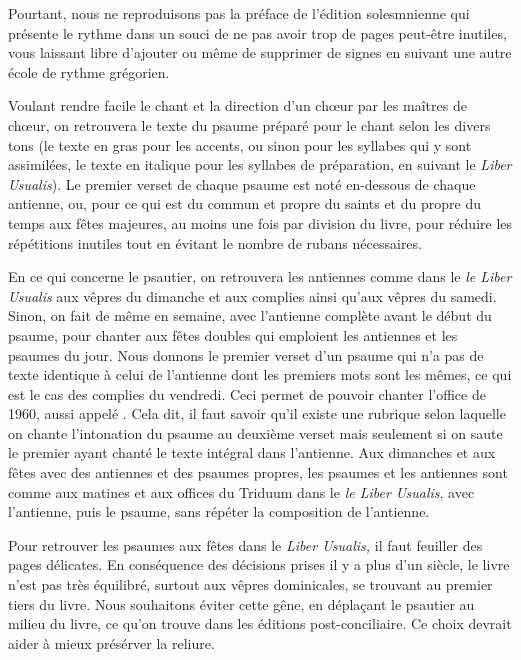 \begin{frpars}
Pourtant, nous ne reproduisons pas la préface de l'édition solesmnienne qui présente le rythme dans un souci de ne pas avoir trop de pages peut-être inutiles, vous laissant libre d'ajouter ou même de supprimer de signes en suivant une autre école de rythme grégorien.

Voulant rendre facile le chant et la direction d'un chœur par les maîtres de chœur, on retrouvera le texte du psaume préparé pour le chant selon les divers tons (le texte en gras pour les accents, ou sinon pour les syllabes qui y sont assimilées, le texte en italique pour les syllabes de préparation, en suivant le \textit{Liber Usualis}). Le premier verset de chaque psaume est noté en-dessous de chaque antienne, ou, pour ce qui est du commun et propre du saints et du propre du temps aux fêtes majeures, au moins une fois par division du livre, pour réduire les répétitions inutiles tout en évitant le nombre de rubans nécessaires.

En ce qui concerne le psautier, on retrouvera les antiennes comme dans le \textit{le Liber Usualis} aux vêpres du dimanche et aux complies ainsi qu'aux vêpres du samedi. Sinon, on fait de même en semaine, avec l'antienne complète avant le début du psaume, pour chanter aux fêtes doubles qui emploient les antiennes et les psaumes du jour. Nous donnons le premier verset d'un psaume qui n'a pas de texte identique à celui de l'antienne dont les premiers mots sont les mêmes, ce qui est le cas des complies du vendredi. Ceci permet de pouvoir chanter l'office de 1960, aussi appelé . Cela dit, il faut savoir qu'il existe une rubrique selon laquelle on chante l'intonation du psaume au deuxième verset mais seulement si on saute le premier ayant chanté le texte intégral dans l'antienne. Aux dimanches et aux fêtes avec des antiennes et des psaumes propres, les psaumes et les antiennes sont comme aux matines et aux offices du Triduum dans le \textit{le Liber Usualis}, avec l'antienne, puis le psaume, sans répéter la composition de l'antienne.

Pour retrouver les psaumes aux fêtes dans le \textit{Liber Usualis,} il faut feuiller des pages délicates. En conséquence des décisions prises il y a plus d'un siècle, le livre n'est pas très équilibré, surtout aux vêpres dominicales, se trouvant au premier tiers du livre. Nous souhaitons éviter cette gêne, en déplaçant le psautier au milieu du livre, ce qu'on trouve dans les éditions post-conciliaire. Ce choix devrait aider à mieux présérver la reliure.


\end{frpars}
